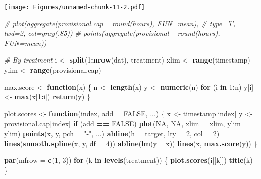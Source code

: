 \documentclass[]{article}
\newenvironment{Shaded}{\begin{snugshade}}{\end{snugshade}}
\newcommand{\KeywordTok}[1]{\textcolor[rgb]{0.13,0.29,0.53}{\textbf{#1}}}
\newcommand{\DataTypeTok}[1]{\textcolor[rgb]{0.13,0.29,0.53}{#1}}
\newcommand{\DecValTok}[1]{\textcolor[rgb]{0.00,0.00,0.81}{#1}}
\newcommand{\StringTok}[1]{\textcolor[rgb]{0.31,0.60,0.02}{#1}}
\newcommand{\CommentTok}[1]{\textcolor[rgb]{0.56,0.35,0.01}{\textit{#1}}}
\newcommand{\OtherTok}[1]{\textcolor[rgb]{0.56,0.35,0.01}{#1}}
\newcommand{\ControlFlowTok}[1]{\textcolor[rgb]{0.13,0.29,0.53}{\textbf{#1}}}
\newcommand{\OperatorTok}[1]{\textcolor[rgb]{0.81,0.36,0.00}{\textbf{#1}}}
\newcommand{\NormalTok}[1]{#1}
\let\oldShaded\Shaded
\let\endoldShaded\endShaded
\renewenvironment{Shaded}{\footnotesize\oldShaded}{\endoldShaded}
\begin{document}
\texttt{[image: Figures/unnamed-chunk-11-2.pdf]}

\begin{Shaded}
\begin{Highlighting}[]
\CommentTok{# plot(aggregate(provisional.cap ~ round(hours), FUN=mean),}
\CommentTok{# type='l', lwd=2, col=gray(.85))}
\CommentTok{# points(aggregate(provisional ~ round(hours), FUN=mean))}


\CommentTok{# By treatment}
\NormalTok{i <-}\StringTok{ }\KeywordTok{split}\NormalTok{(}\DecValTok{1}\OperatorTok{:}\KeywordTok{nrow}\NormalTok{(dat), treatment)}
\NormalTok{xlim <-}\StringTok{ }\KeywordTok{range}\NormalTok{(timestamp)}
\NormalTok{ylim <-}\StringTok{ }\KeywordTok{range}\NormalTok{(provisional.cap)}

\NormalTok{max.score <-}\StringTok{ }\ControlFlowTok{function}\NormalTok{(x) \{}
\NormalTok{    n <-}\StringTok{ }\KeywordTok{length}\NormalTok{(x)}
\NormalTok{    y <-}\StringTok{ }\KeywordTok{numeric}\NormalTok{(n)}
    \ControlFlowTok{for}\NormalTok{ (i }\ControlFlowTok{in} \DecValTok{1}\OperatorTok{:}\NormalTok{n) y[i] <-}\StringTok{ }\KeywordTok{max}\NormalTok{(x[}\DecValTok{1}\OperatorTok{:}\NormalTok{i])}
    \KeywordTok{return}\NormalTok{(y)}
\NormalTok{\}}


\NormalTok{plot.scores <-}\StringTok{ }\ControlFlowTok{function}\NormalTok{(index, }\DataTypeTok{add =} \OtherTok{FALSE}\NormalTok{, ...) \{}
\NormalTok{    x <-}\StringTok{ }\NormalTok{timestamp[index]}
\NormalTok{    y <-}\StringTok{ }\NormalTok{provisional.cap[index]}
    \ControlFlowTok{if}\NormalTok{ (add }\OperatorTok{==}\StringTok{ }\OtherTok{FALSE}\NormalTok{) }
        \KeywordTok{plot}\NormalTok{(}\OtherTok{NA}\NormalTok{, }\OtherTok{NA}\NormalTok{, }\DataTypeTok{xlim =}\NormalTok{ xlim, }\DataTypeTok{ylim =}\NormalTok{ ylim)}
    \KeywordTok{points}\NormalTok{(x, y, }\DataTypeTok{pch =} \StringTok{"-"}\NormalTok{, ...)}
    \KeywordTok{abline}\NormalTok{(}\DataTypeTok{h =}\NormalTok{ target, }\DataTypeTok{lty =} \DecValTok{2}\NormalTok{, }\DataTypeTok{col =} \DecValTok{2}\NormalTok{)}
    \KeywordTok{lines}\NormalTok{(}\KeywordTok{smooth.spline}\NormalTok{(x, y, }\DataTypeTok{df =} \DecValTok{4}\NormalTok{))}
    \KeywordTok{abline}\NormalTok{(}\KeywordTok{lm}\NormalTok{(y }\OperatorTok{~}\StringTok{ }\NormalTok{x))}
    \KeywordTok{lines}\NormalTok{(x, }\KeywordTok{max.score}\NormalTok{(y))}
\NormalTok{\}}

\KeywordTok{par}\NormalTok{(}\DataTypeTok{mfrow =} \KeywordTok{c}\NormalTok{(}\DecValTok{1}\NormalTok{, }\DecValTok{3}\NormalTok{))}
\ControlFlowTok{for}\NormalTok{ (k }\ControlFlowTok{in} \KeywordTok{levels}\NormalTok{(treatment)) \{}
    \KeywordTok{plot.scores}\NormalTok{(i[[k]])}
    \KeywordTok{title}\NormalTok{(k)}
\NormalTok{\}}
\end{Highlighting}
\end{Shaded}
\end{document}
